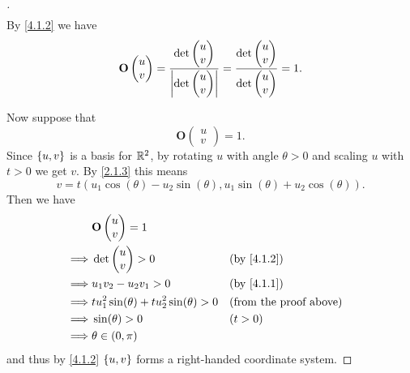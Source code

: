 \begin{proof}[]
\begin{align*}
  \end{align*}
  By \cref{4.1.2} we have
  \[
    \mathbf{O}\begin{pmatrix}
      u \\
      v
    \end{pmatrix} = \frac{\det\begin{pmatrix}
        u \\
        v
      \end{pmatrix}}{\left\lvert\det\begin{pmatrix}
          u \\
          v
        \end{pmatrix}\right\rvert} = \frac{\det\begin{pmatrix}
        u \\
        v
      \end{pmatrix}}{\det\begin{pmatrix}
        u \\
        v
      \end{pmatrix}} = 1.
  \]

  Now suppose that
  \[
    \mathbf{O}\begin{pmatrix}
      u \\
      v
    \end{pmatrix} = 1.
  \]
  Since \(\left\lbrace u, v\right\rbrace\) is a basis for \(\mathbb{R}^2\), by rotating \(u\) with angle \(\theta > 0\) and scaling \(u\) with \(t > 0\) we get \(v\).
  By \cref{2.1.3} this means
  \[
    v = t (u_1 \cos(\theta) - u_2 \sin(\theta), u_1 \sin(\theta) + u_2 \cos(\theta)).
  \]
  Then we have
  \begin{align*}
             & \mathbf{O}\begin{pmatrix}
                           u \\
                           v
                         \end{pmatrix} = 1                                                        \\
    \implies & \det\begin{pmatrix}
                     u \\
                     v
                   \end{pmatrix} > 0                             &  & \by{4.1.2}                  \\
    \implies & u_1 v_2 - u_2 v_1 > 0                           &  & \by{4.1.1}                    \\
    \implies & t u_1^2 \sin(\theta) + t u_2^2 \sin(\theta) > 0 &  & \text{(from the proof above)} \\
    \implies & \sin(\theta) > 0                                &  & (t > 0)                       \\
    \implies & \theta \in (0, \pi)
  \end{align*}
  and thus by \cref{4.1.2} \(\left\lbrace u, v\right\rbrace\) forms a right-handed coordinate system.
\end{proof}

